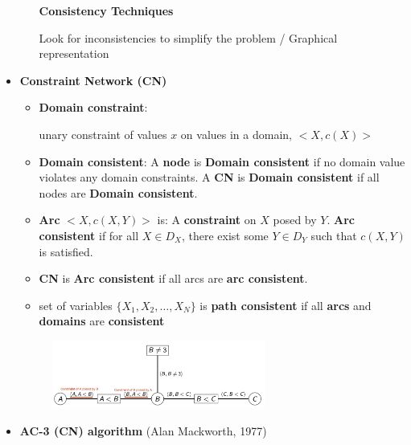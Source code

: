 \documentclass{article}
\theoremstyle{note}
\begin{document}
\begin{itemize}
\begin{itemize}
     
    \subitem \textbf{Consistency Techniques} 
    
    Look for inconsistencies to simplify the problem / Graphical representation
  \end{itemize}
  
  \item\textbf{Constraint Network (CN)}
  	
  	\begin{itemize}
    \item \textbf{Domain constraint}: 
    
    unary constraint of values $x$ on values in a domain, $<X,c(X)>$
    \item \textbf{Domain consistent}: 
    \subitem A \textbf{node} is \textbf{Domain consistent} if no domain value violates any domain constraints. 
    \subitem A \textbf{CN} is \textbf{Domain consistent} if all nodes are \textbf{Domain consistent}.
    
    \item \textbf{Arc} $<X, c(X,Y)>$ is:
    \subitem A \textbf{constraint} on $X$ posed by $Y$.
    \subitem  \textbf{Arc consistent} if for all $X \in D_X$, there exist some $Y \in D_Y$ such that $c(X,Y)$ is satisfied.
    
  	\item \textbf{CN} is \textbf{Arc consistent} if all arcs are \textbf{arc consistent}.
  	
  	\item set of variables $\{X_1,X_2, \dots, X_N\}$ is \textbf{path consistent} if all \textbf{arcs} and \textbf{domains} are \textbf{consistent}

  \end{itemize}
  	\begin{figure}[!htbp]
  	\center
  	\includegraphics[width=7cm]{CSP_Graph.png}
  	\end{figure}
  	
  \item\textbf{AC-3 (CN) algorithm} (Alan Mackworth, 1977)
  

\end{itemize}
\end{document}
